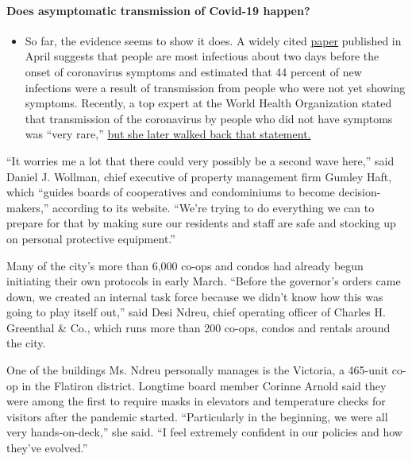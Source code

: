 \begin{itemize}
{  \paragraph{Does asymptomatic transmission of Covid-19
  happen?}\label{does-asymptomatic-transmission-of-covid-19-happen}}

  \begin{itemize}
  \tightlist
  \item
    So far, the evidence seems to show it does. A widely cited
    \href{https://www.nature.com/articles/s41591-020-0869-5}{paper}
    published in April suggests that people are most infectious about
    two days before the onset of coronavirus symptoms and estimated that
    44 percent of new infections were a result of transmission from
    people who were not yet showing symptoms. Recently, a top expert at
    the World Health Organization stated that transmission of the
    coronavirus by people who did not have symptoms was ``very rare,''
    \href{https://www.nytimes.com/2020/06/09/world/coronavirus-updates.html?action=click\&pgtype=Article\&state=default\&region=MAIN_CONTENT_3\&context=storylines_faq\#link-1f302e21}{but
    she later walked back that statement.}
  \end{itemize}
\end{itemize}

``It worries me a lot that there could very possibly be a second wave
here,'' said Daniel J. Wollman, chief executive of property management
firm Gumley Haft, which ``guides boards of cooperatives and condominiums
to become decision-makers,'' according to its website. ``We're trying to
do everything we can to prepare for that by making sure our residents
and staff are safe and stocking up on personal protective equipment.''

Many of the city's more than 6,000 co-ops and condos had already begun
initiating their own protocols in early March. ``Before the governor's
orders came down, we created an internal task force because we didn't
know how this was going to play itself out,'' said Desi Ndreu, chief
operating officer of Charles H. Greenthal \& Co., which runs more than
200 co-ops, condos and rentals around the city.

One of the buildings Ms. Ndreu personally manages is the Victoria, a
465-unit co-op in the Flatiron district. Longtime board member Corinne
Arnold said they were among the first to require masks in elevators and
temperature checks for visitors after the pandemic started.
``Particularly in the beginning, we were all very hands-on-deck,'' she
said. ``I feel extremely confident in our policies and how they've
evolved.''

